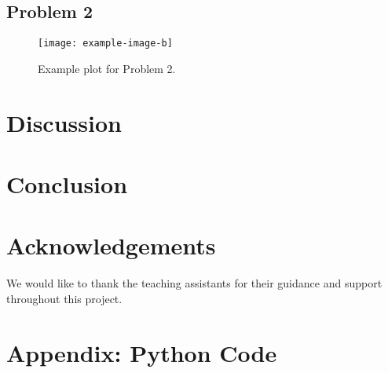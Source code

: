 \documentclass{article}
\begin{document}
\subsection{Problem 2}
\lipsum[7]
\begin{figure}[H]
    \centering
    \texttt{[image: example-image-b]}
    \caption{Example plot for Problem 2.}
    \label{fig:problem2}
\end{figure}

\section{Discussion}
\lipsum[8]

\section{Conclusion}
\lipsum[9]

\section*{Acknowledgements}
We would like to thank the teaching assistants for their guidance and support throughout this project.




\appendix
\section{Appendix: Python Code}
\inputminted{python}{code.py}
\end{document}
